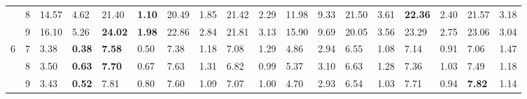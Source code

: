 \documentclass[conference]{IEEEtran}
\begin{document}
\begin{table}[]
\begin{tabular}{|cl|ll|ll|ll|ll|ll|ll|ll|ll|}
		\multicolumn{1}{|c|}{}                    & 8          & \multicolumn{1}{l|}{14.57}         & 4.62          & \multicolumn{1}{l|}{21.40}          & \textbf{1.10} & \multicolumn{1}{l|}{20.49}          & 1.85          & \multicolumn{1}{l|}{21.42}          & 2.29          & \multicolumn{1}{l|}{11.98}                & 9.33  & \multicolumn{1}{l|}{21.50} & 3.61 & \multicolumn{1}{l|}{\textbf{22.36}} & 2.40          & \multicolumn{1}{l|}{21.57}          & 3.18          \\ \cline{2-18} 
		\multicolumn{1}{|c|}{}                    & 9          & \multicolumn{1}{l|}{16.10}         & 5.26          & \multicolumn{1}{l|}{\textbf{24.02}} & \textbf{1.98} & \multicolumn{1}{l|}{22.86}          & 2.84          & \multicolumn{1}{l|}{21.81}          & 3.13          & \multicolumn{1}{l|}{15.90}                & 9.69  & \multicolumn{1}{l|}{20.05} & 3.56 & \multicolumn{1}{l|}{23.29}          & 2.75          & \multicolumn{1}{l|}{23.06}          & 3.04          \\ \hline
		\multicolumn{1}{|c|}{\multirow{3}{*}{6}}  & 7          & \multicolumn{1}{l|}{3.38}          & \textbf{0.38} & \multicolumn{1}{l|}{\textbf{7.58}}  & 0.50          & \multicolumn{1}{l|}{7.38}           & 1.18          & \multicolumn{1}{l|}{7.08}           & 1.29          & \multicolumn{1}{l|}{4.86}                 & 2.94  & \multicolumn{1}{l|}{6.55}  & 1.08 & \multicolumn{1}{l|}{7.14}           & 0.91          & \multicolumn{1}{l|}{7.06}           & 1.47          \\ \cline{2-18} 
		\multicolumn{1}{|c|}{}                    & 8          & \multicolumn{1}{l|}{3.50}          & \textbf{0.63} & \multicolumn{1}{l|}{\textbf{7.70}}  & 0.67          & \multicolumn{1}{l|}{7.63}           & 1.31          & \multicolumn{1}{l|}{6.82}           & 0.99          & \multicolumn{1}{l|}{5.37}                 & 3.10  & \multicolumn{1}{l|}{6.63}  & 1.28 & \multicolumn{1}{l|}{7.36}           & 1.03          & \multicolumn{1}{l|}{7.49}           & 1.18          \\ \cline{2-18} 
		\multicolumn{1}{|c|}{}                    & 9          & \multicolumn{1}{l|}{3.43}          & \textbf{0.52} & \multicolumn{1}{l|}{7.81}           & 0.80          & \multicolumn{1}{l|}{7.60}           & 1.09          & \multicolumn{1}{l|}{7.07}           & 1.00          & \multicolumn{1}{l|}{4.70}                 & 2.93  & \multicolumn{1}{l|}{6.54}  & 1.03 & \multicolumn{1}{l|}{7.71}           & 0.94          & \multicolumn{1}{l|}{\textbf{7.82}}  & 1.14          \\ \hline

\end{tabular}
\end{table}
\end{document}

